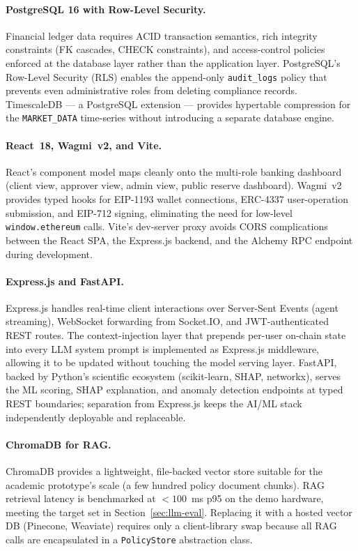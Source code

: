 \paragraph{PostgreSQL 16 with Row-Level Security.}
Financial ledger data requires ACID transaction semantics, rich integrity
constraints (FK cascades, CHECK constraints), and access-control policies
enforced at the database layer rather than the application layer. PostgreSQL's
Row-Level Security (RLS) enables the append-only \texttt{audit\_logs} policy
that prevents even administrative roles from deleting compliance records.
TimescaleDB --- a PostgreSQL extension --- provides hypertable compression for
the \texttt{MARKET\_DATA} time-series without introducing a separate database
engine.

\paragraph{React~18, Wagmi~v2, and Vite.}
React's component model maps cleanly onto the multi-role banking dashboard
(client view, approver view, admin view, public reserve dashboard). Wagmi~v2
provides typed hooks for EIP-1193 wallet connections, ERC-4337 user-operation
submission, and EIP-712 signing, eliminating the need for low-level
\texttt{window.ethereum} calls. Vite's dev-server proxy avoids CORS
complications between the React SPA, the Express.js backend, and the Alchemy
RPC endpoint during development.

\paragraph{Express.js and FastAPI.}
Express.js handles real-time client interactions over Server-Sent Events
(agent streaming), WebSocket forwarding from Socket.IO, and JWT-authenticated
REST routes. The context-injection layer that prepends per-user on-chain state
into every LLM system prompt is implemented as Express.js middleware, allowing
it to be updated without touching the model serving layer. FastAPI, backed by
Python's scientific ecosystem (scikit-learn, SHAP, networkx), serves the ML
scoring, SHAP explanation, and anomaly detection endpoints at typed REST
boundaries; separation from Express.js keeps the AI/ML stack independently
deployable and replaceable.

\paragraph{ChromaDB for RAG.}
ChromaDB provides a lightweight, file-backed vector store suitable for the
academic prototype's scale (a few hundred policy document chunks). RAG
retrieval latency is benchmarked at $<100$~ms p95 on the demo hardware,
meeting the target set in Section~\ref{sec:llm-eval}. Replacing it with a
hosted vector DB (Pinecone, Weaviate) requires only a client-library swap
because all RAG calls are encapsulated in a \texttt{PolicyStore} abstraction
class.

